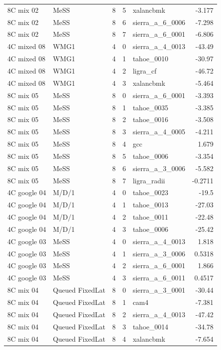 \begin{tabular}{llrrlr}
8C mix 02 & MeSS & 8 & 5 & xalancbmk & -3.177 \\
8C mix 02 & MeSS & 8 & 6 & sierra\_a\_6\_0006 & -7.298 \\
8C mix 02 & MeSS & 8 & 7 & sierra\_a\_6\_0001 & -6.806 \\
4C mixed 08 & WMG1 & 4 & 0 & sierra\_a\_4\_0013 & -43.49 \\
4C mixed 08 & WMG1 & 4 & 1 & tahoe\_0010 & -30.97 \\
4C mixed 08 & WMG1 & 4 & 2 & ligra\_cf & -46.72 \\
4C mixed 08 & WMG1 & 4 & 3 & xalancbmk & -5.464 \\
8C mix 05 & MeSS & 8 & 0 & sierra\_a\_6\_0001 & -3.393 \\
8C mix 05 & MeSS & 8 & 1 & tahoe\_0035 & -3.385 \\
8C mix 05 & MeSS & 8 & 2 & tahoe\_0016 & -3.508 \\
8C mix 05 & MeSS & 8 & 3 & sierra\_a\_4\_0005 & -4.211 \\
8C mix 05 & MeSS & 8 & 4 & gcc & 1.679 \\
8C mix 05 & MeSS & 8 & 5 & tahoe\_0006 & -3.354 \\
8C mix 05 & MeSS & 8 & 6 & sierra\_a\_3\_0006 & -5.582 \\
8C mix 05 & MeSS & 8 & 7 & ligra\_radii & -0.2711 \\
4C google 04 & M/D/1 & 4 & 0 & tahoe\_0023 & -19.5 \\
4C google 04 & M/D/1 & 4 & 1 & tahoe\_0013 & -27.03 \\
4C google 04 & M/D/1 & 4 & 2 & tahoe\_0011 & -22.48 \\
4C google 04 & M/D/1 & 4 & 3 & tahoe\_0006 & -25.42 \\
4C google 03 & MeSS & 4 & 0 & sierra\_a\_4\_0013 & 1.818 \\
4C google 03 & MeSS & 4 & 1 & sierra\_a\_3\_0006 & 0.5318 \\
4C google 03 & MeSS & 4 & 2 & sierra\_a\_6\_0001 & 1.866 \\
4C google 03 & MeSS & 4 & 3 & sierra\_a\_6\_0011 & 0.4517 \\
8C mix 04 & Queued FixedLat & 8 & 0 & sierra\_a\_3\_0001 & -30.44 \\
8C mix 04 & Queued FixedLat & 8 & 1 & cam4 & -7.381 \\
8C mix 04 & Queued FixedLat & 8 & 2 & sierra\_a\_4\_0013 & -47.42 \\
8C mix 04 & Queued FixedLat & 8 & 3 & tahoe\_0014 & -34.78 \\
8C mix 04 & Queued FixedLat & 8 & 4 & xalancbmk & -7.654 \\

\end{tabular}
